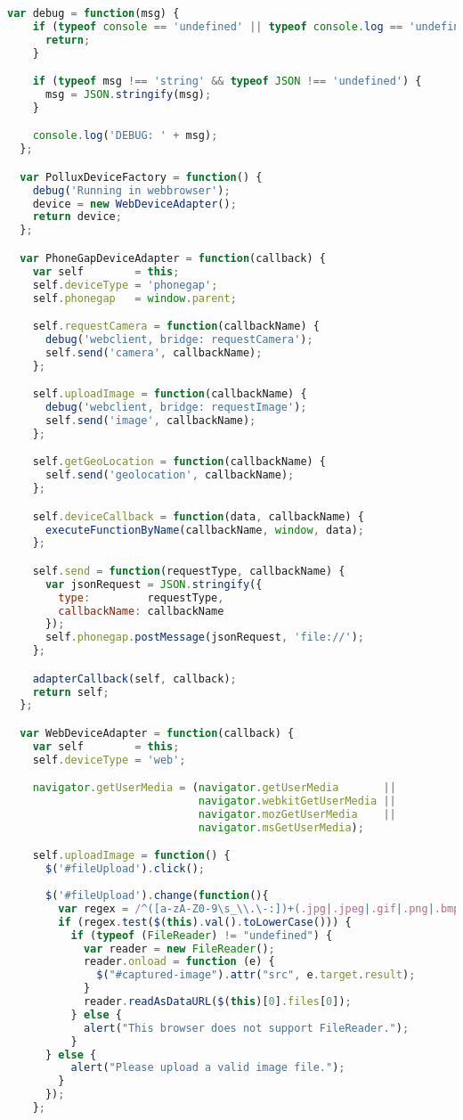 \begin{appendices}
\begin{lstlisting}[language=JavaScript]
  var debug = function(msg) {
    if (typeof console == 'undefined' || typeof console.log == 'undefined') {
      return;
    }

    if (typeof msg !== 'string' && typeof JSON !== 'undefined') {
      msg = JSON.stringify(msg);
    }

    console.log('DEBUG: ' + msg);
  };

  var PolluxDeviceFactory = function() {
    debug('Running in webbrowser');
    device = new WebDeviceAdapter();
    return device;
  };

  var PhoneGapDeviceAdapter = function(callback) {
    var self        = this;
    self.deviceType = 'phonegap';
    self.phonegap   = window.parent;

    self.requestCamera = function(callbackName) {
      debug('webclient, bridge: requestCamera');
      self.send('camera', callbackName);
    };

    self.uploadImage = function(callbackName) {
      debug('webclient, bridge: requestImage');
      self.send('image', callbackName);
    };

    self.getGeoLocation = function(callbackName) {
      self.send('geolocation', callbackName);
    };

    self.deviceCallback = function(data, callbackName) {
      executeFunctionByName(callbackName, window, data);
    };

    self.send = function(requestType, callbackName) {
      var jsonRequest = JSON.stringify({
        type:         requestType,
        callbackName: callbackName
      });
      self.phonegap.postMessage(jsonRequest, 'file://');
    };

    adapterCallback(self, callback);
    return self;
  };

  var WebDeviceAdapter = function(callback) {
    var self        = this;
    self.deviceType = 'web';

    navigator.getUserMedia = (navigator.getUserMedia       ||
                              navigator.webkitGetUserMedia ||
                              navigator.mozGetUserMedia    ||
                              navigator.msGetUserMedia);

    self.uploadImage = function() {
      $('#fileUpload').click();
      
      $('#fileUpload').change(function(){
        var regex = /^([a-zA-Z0-9\s_\\.\-:])+(.jpg|.jpeg|.gif|.png|.bmp)$/;
        if (regex.test($(this).val().toLowerCase())) {
          if (typeof (FileReader) != "undefined") {
            var reader = new FileReader();
            reader.onload = function (e) {
              $("#captured-image").attr("src", e.target.result);
            }
            reader.readAsDataURL($(this)[0].files[0]);
          } else {
            alert("This browser does not support FileReader.");
          }
      } else {
          alert("Please upload a valid image file.");
        }
      });
    };


\end{lstlisting}
\end{appendices}
